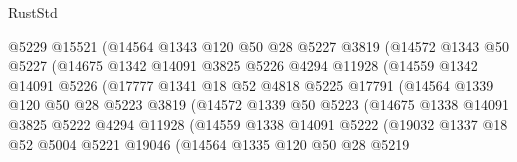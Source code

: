 \begin{lexlean}{RustStd}
\begin{coremodule}
                      @5229
                      @15521
                      (@14564
                        @1343
                        @120
                        @50
                        @28
                        @5227
                        @3819
                        (@14572
                          @1343
                          @50
                          @5227
                          (@14675
                            @1342
                            @14091
                            @3825
                            @5226
                            @4294
                            @11928
                            (@14559
                              @1342
                              @14091
                              @5226
                              (@17777
                                @1341
                                @18
                                @52
                                @4818
                                @5225
                                @17791
                                (@14564
                                  @1339
                                  @120
                                  @50
                                  @28
                                  @5223
                                  @3819
                                  (@14572
                                    @1339
                                    @50
                                    @5223
                                    (@14675
                                      @1338
                                      @14091
                                      @3825
                                      @5222
                                      @4294
                                      @11928
                                      (@14559
                                        @1338
                                        @14091
                                        @5222
                                        (@19032
                                          @1337
                                          @18
                                          @52
                                          @5004
                                          @5221
                                          @19046
                                          (@14564
                                            @1335
                                            @120
                                            @50
                                            @28
                                            @5219

\end{coremodule}
\end{lexlean}
